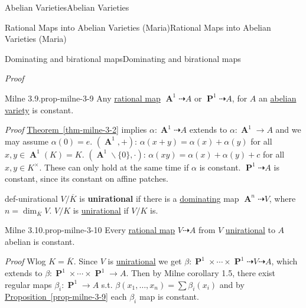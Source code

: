 \documentclass[10pt,]{book}
\makeatletter
\newcommand{\terminology}[1]{\textbf{#1}}
\renewcommand*{\proofname}{Proof}
\renewenvironment{proof}[1][\proofname]{\par
  \pushQED{\qed}%
  \normalfont \topsep6\p@\@plus6\p@\relax
  \trivlist
  \item\relax
    {\itshape
    #1\@addpunct{.}}\hspace\labelsep\ignorespaces
}{%
  \popQED\endtrivlist\@endpefalse
}
\numberwithin{equation}{section}
\DeclareMathOperator{\aff}{\mathbf{A}}
\DeclareMathOperator{\PP}{\mathbf{P}}
\makeatother
\begin{document}
\begin{chapterptx}{Abelian Varieties}{}{Abelian Varieties}{}{}
\begin{sectionptx}{Rational Maps into Abelian Varieties (Maria)}{}{Rational Maps into Abelian Varieties (Maria)}{}{}
\begin{subsectionptx}{Dominating and birational maps}{}{Dominating and birational maps}{}{}
\begin{proof}
\end{proof}
\begin{proposition}{Milne 3.9.}{}{prop-milne-3-9}%
\hypertarget{p-102}{}%
Any \hyperref[def-rational-map]{rational map} \(\aff^1 \dashrightarrow A\) or \(\PP^1 \dashrightarrow A\), for \(A\) an \hyperref[def-buntes-abvar]{abelian variety} is constant.%
\end{proposition}
\begin{proof}\hypertarget{proof-17}{}
\hypertarget{p-103}{}%
\hyperref[thm-milne-3-2]{Theorem~\ref{thm-milne-3-2}} implies \(\alpha \colon \aff^1 \dashrightarrow A\) extends to \(\alpha \colon \aff^1\to A\) and we may assume \(\alpha(0) = e\). \((\aff^1, +)\): \(\alpha(x+y) = \alpha(x) + \alpha(y)\) for all \(x,y\in \aff^1(K) = K\). \((\aff^1\smallsetminus\{0\}, \cdot)\): \(\alpha(xy) = \alpha(x) + \alpha(y) + c\) for all \(x,y\in K^\times\). These can only hold at the same time if \(\alpha\) is constant. \(\PP^1 \dashrightarrow A\) is constant, since its constant on affine patches.%
\end{proof}
\begin{definition}{}{def-unirational}%
\hypertarget{p-104}{}%
\(V/\overline K\) is \terminology{unirational} if there is a \hyperref[def-dominating-maps]{dominating} map \(\aff^n \dashrightarrow V\), where \(n = \dim_{\overline K} V\). \(V/K\) is \hyperref[def-unirational]{unirational} if \(V/K\) is.%
\end{definition}
\begin{proposition}{Milne 3.10.}{}{prop-milne-3-10}%
\hypertarget{p-105}{}%
Every \hyperref[def-rational-map]{rational map} \(V\dashrightarrow A\) from \(V\) \hyperref[def-unirational]{unirational} to \(A\) abelian is constant.%
\end{proposition}
\begin{proof}\hypertarget{proof-18}{}
\hypertarget{p-106}{}%
Wlog \(K = \overline K\). Since \(V\) is \hyperref[def-unirational]{unirational} we get \(\beta \colon \PP^1\times\cdots\times\PP^1 \dashrightarrow V\dashrightarrow A\), which extends to \(\beta \colon \PP^1\times\cdots\times\PP^1 \to A\). Then by Milne corollary 1.5, there exist regular maps \(\beta_i \colon \PP^1 \to A\) s.t. \(\beta(x_1,\ldots, x_n) = \sum \beta_i(x_i)\) and by \hyperref[prop-milne-3-9]{Proposition~\ref{prop-milne-3-9}} each \(\beta_i\) map is constant.%
\end{proof}
\end{subsectionptx}
\end{sectionptx}
%
%
\typeout{************************************************}

\end{chapterptx}
\end{document}
